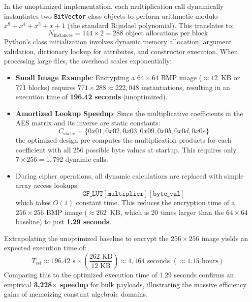 \documentclass[11pt,a4paper]{article}
\begin{document}
In the unoptimized implementation, each multiplication call dynamically instantiates two \texttt{BitVector} class objects to perform arithmetic modulo $x^8 + x^4 + x^3 + x + 1$ (the standard Rijndael polynomial). This translates to:
\begin{equation}
    N_{\text{instances}} = 144 \times 2 = 288 \text{ object allocations per block}
\end{equation}
Python's class initialization involves dynamic memory allocation, argument validation, dictionary lookup for attributes, and constructor execution. When processing large files, the overhead scales exponentially:
\begin{itemize}
    \item \textbf{Small Image Example}: Encrypting a $64 \times 64$ BMP image ($\approx 12$~KB or 771 blocks) requires $771 \times 288 \approx 222,048$ instantiations, resulting in an execution time of \textbf{196.42 seconds} (unoptimized).
    \item \textbf{Amortized Lookup Speedup}: Since the multiplicative coefficients in the AES matrix and its inverse are static constants:
    \begin{equation}
        C_{\text{static}} = \{0x01, 0x02, 0x03, 0x09, 0x0b, 0x0d, 0x0e\}
    \end{equation}
    the optimized design pre-computes the multiplication products for each coefficient with all 256 possible byte values at startup. This requires only $7 \times 256 = 1,792$ dynamic calls.
    \item During cipher operations, all dynamic calculations are replaced with simple array access lookups:
    \begin{equation}
        \mathtt{GF\_LUT[multiplier][byte\_val]}
    \end{equation}
    which takes $O(1)$ constant time. This reduces the encryption time of a $256 \times 256$ BMP image ($\approx 262$~KB, which is 20 times larger than the $64 \times 64$ baseline) to just \textbf{1.29 seconds}.
\end{itemize}
Extrapolating the unoptimized baseline to encrypt the $256 \times 256$ image yields an expected execution time of:
\begin{equation}
    T_{\text{est}} \approx 196.42 \text{ s} \times \left(\frac{262 \text{ KB}}{12 \text{ KB}}\right) \approx 4,164 \text{ seconds } (\approx 1.15 \text{ hours})
\end{equation}
Comparing this to the optimized execution time of 1.29 seconds confirms an empirical \textbf{3,228$\times$ speedup} for bulk payloads, illustrating the massive efficiency gains of memoizing constant algebraic domains.
\end{document}
